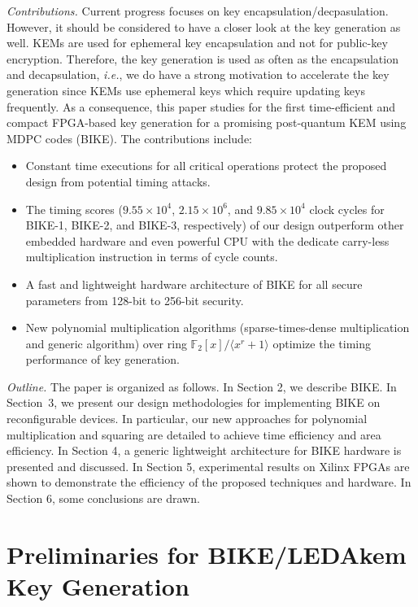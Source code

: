 \documentclass[runningheads]{llncs}
\begin{document}
\textit{Contributions.} Current progress focuses on key encapsulation/decpasulation. However, it should be considered to have a closer look at the
key generation as well. KEMs are used for ephemeral
key encapsulation and not for public-key encryption. Therefore, the key
generation is used as often as the encapsulation and decapsulation, \textit{i.e.},
we do have a strong motivation to accelerate the key generation since KEMs use ephemeral keys which require updating keys frequently.
As a consequence, this paper studies for the first time-efficient and compact FPGA-based key generation for a promising post-quantum KEM using MDPC codes (BIKE). The contributions include:
\begin{itemize}
  \item Constant time executions for all critical operations protect the proposed design from potential timing attacks.
  \item The timing scores ($9.55 \times 10^4$, $2.15 \times 10^6$, and $9.85 \times 10^4$ clock cycles for BIKE-1, BIKE-2, and BIKE-3, respectively) of our design outperform other embedded hardware and even powerful CPU with the dedicate carry-less multiplication instruction in terms of cycle counts.
  \item A fast and lightweight hardware architecture of BIKE for all secure parameters from 128-bit to 256-bit security.
  \item New polynomial multiplication algorithms (sparse-times-dense multiplication and generic algorithm) over ring $\mathbb{F}_2[x]/\langle x^r+1\rangle$ optimize the timing performance of key generation.
\end{itemize}

\textit{Outline.} The paper is organized as follows. In Section 2, we describe BIKE. In Section~3, we present our design methodologies for implementing BIKE on reconfigurable devices. In particular, our new approaches for polynomial multiplication and squaring are detailed to achieve time efficiency and area efficiency. In Section 4, a generic lightweight architecture for BIKE hardware is presented and discussed. In Section 5, experimental results on Xilinx FPGAs are shown to demonstrate the efficiency of the proposed techniques and hardware. In Section 6, some conclusions are drawn.

\section{Preliminaries for BIKE/LEDAkem Key Generation}
\end{document}
